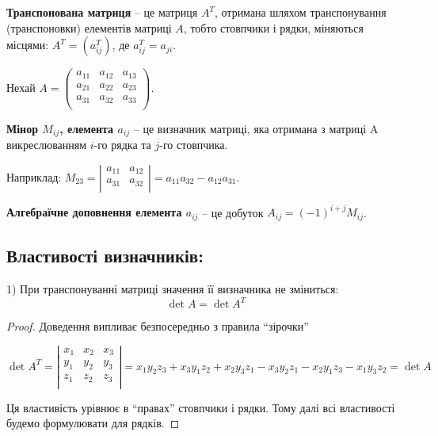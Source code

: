 \begin{definition}
	\textbf{Транспонована матриця} -- це матриця $A^T$, отримана шляхом транспонування (транспоновки) елементів матриці $A$, тобто стовпчики і рядки, міняються місцями: $A^T = (a_{ij}^T)$, де $a_{ij}^T = a_{ji}$.
\end{definition}

Нехай $A = \begin{pmatrix}
	a_{11} & a_{12} & a_{13} \\
	a_{21} & a_{22} & a_{23} \\
	a_{31} & a_{32} & a_{33} \\
\end{pmatrix}$.

\begin{definition}[Мінор]
	\textbf{Мінор $M_{ij}$, елемента $a_{ij}$} -- це визначник матриці, яка отримана з
	матриці A викреслюванням $i$-го рядка та $j$-го стовпчика. 
\end{definition}

Наприклад: $M_{23} = \left|\begin{matrix}
	a_{11} & a_{12} \\
	a_{31} & a_{32} \\
\end{matrix}\right| = a_{11}a_{32} - a_{12}a_{31}$.

\begin{definition}
	\textbf{Алгебраїчне доповнення елемента $a_{ij}$} -- це добуток $A_{ij} = (-1)^{i+j}M_{ij}$.
\end{definition}

\subsection*{Властивості визначників:}

1) При транспонуванні матриці значення її визначника не зміниться: 
$$\det A = \det A^T$$
\begin{proof}
	Доведення випливає безпосередньо з правила “зірочки”
	
	$\det A^T = \left|\begin{matrix}
		x_1 & x_2 & x_3 \\
		y_1 & y_2 & y_3 \\
		z_1 & z_2 & z_3 \\
	\end{matrix}\right|
	= x_1y_2z_3 + x_3y_1z_2 + x_2y_3z_1 - x_3y_2z_1 - x_2y_1z_3 - x_1y_3z_2 = \det A$

	Ця властивість урівнює в “правах” стовпчики і рядки. Тому далі всі властивості будемо формулювати для рядків.
\end{proof}

